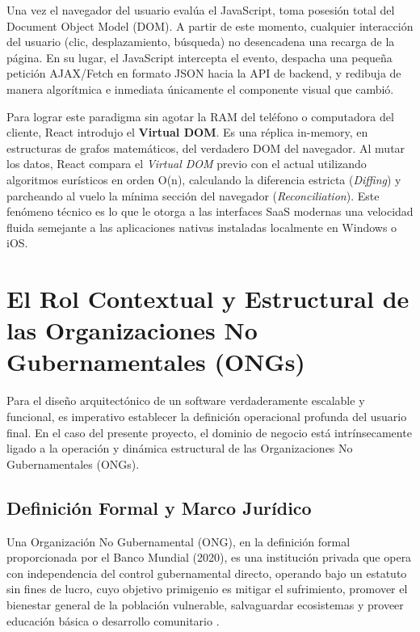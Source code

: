 \documentclass[11pt,a4paper,oneside]{report}
\begin{document}
Una vez el navegador del usuario eval\'ua el JavaScript, toma posesi\'on total del Document Object Model (DOM). A partir de este momento, cualquier interacci\'on del usuario (clic, desplazamiento, b\'usqueda) no desencadena una recarga de la p\'agina. En su lugar, el JavaScript intercepta el evento, despacha una peque\~na petici\'on AJAX/Fetch en formato JSON hacia la API de backend, y redibuja de manera algor\'itmica e inmediata \'unicamente el componente visual que cambi\'o.

Para lograr este paradigma sin agotar la RAM del tel\'efono o computadora del cliente, React introdujo el \textbf{Virtual DOM}. Es una r\'eplica in-memory, en estructuras de grafos matem\'aticos, del verdadero DOM del navegador. Al mutar los datos, React compara el \textit{Virtual DOM} previo con el actual utilizando algoritmos eur\'isticos en orden O(n), calculando la diferencia estricta (\textit{Diffing}) y parcheando al vuelo la m\'inima secci\'on del navegador (\textit{Reconciliation}). Este fen\'omeno t\'ecnico es lo que le otorga a las interfaces SaaS modernas una velocidad fluida semejante a las aplicaciones nativas instaladas localmente en Windows o iOS.


\section{El Rol Contextual y Estructural de las Organizaciones No Gubernamentales (ONGs)}

Para el dise\~no arquitect\'onico de un software verdaderamente escalable y funcional, es imperativo establecer la definici\'on operacional profunda del usuario final. En el caso del presente proyecto, el dominio de negocio est\'a intr\'insecamente ligado a la operaci\'on y din\'amica estructural de las Organizaciones No Gubernamentales (ONGs).

\subsection{Definici\'on Formal y Marco Jur\'idico}
Una Organizaci\'on No Gubernamental (ONG), en la definici\'on formal proporcionada por el Banco Mundial (2020), es una instituci\'on privada que opera con independencia del control gubernamental directo, operando bajo un estatuto sin fines de lucro, cuyo objetivo primigenio es mitigar el sufrimiento, promover el bienestar general de la poblaci\'on vulnerable, salvaguardar ecosistemas y proveer educaci\'on b\'asica o desarrollo comunitario \citep{bancomundial2020}. 
\end{document}
